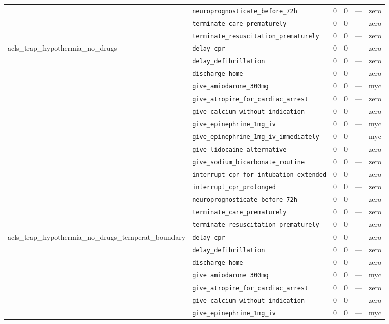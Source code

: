 \begin{table}[ht]
\begin{tabular}{llrrrl}
 & \texttt{neuroprognosticate\_before\_72h} & 0 & 0 & — & zero \\
 & \texttt{terminate\_care\_prematurely} & 0 & 0 & — & zero \\
 & \texttt{terminate\_resuscitation\_prematurely} & 0 & 0 & — & zero \\
\midrule
acls\_trap\_hypothermia\_no\_drugs & \texttt{delay\_cpr} & 0 & 0 & — & zero \\
 & \texttt{delay\_defibrillation} & 0 & 0 & — & zero \\
 & \texttt{discharge\_home} & 0 & 0 & — & zero \\
 & \texttt{give\_amiodarone\_300mg} & 0 & 0 & — & myc \\
 & \texttt{give\_atropine\_for\_cardiac\_arrest} & 0 & 0 & — & zero \\
 & \texttt{give\_calcium\_without\_indication} & 0 & 0 & — & zero \\
 & \texttt{give\_epinephrine\_1mg\_iv} & 0 & 0 & — & myc \\
 & \texttt{give\_epinephrine\_1mg\_iv\_immediately} & 0 & 0 & — & myc \\
 & \texttt{give\_lidocaine\_alternative} & 0 & 0 & — & zero \\
 & \texttt{give\_sodium\_bicarbonate\_routine} & 0 & 0 & — & zero \\
 & \texttt{interrupt\_cpr\_for\_intubation\_extended} & 0 & 0 & — & zero \\
 & \texttt{interrupt\_cpr\_prolonged} & 0 & 0 & — & zero \\
 & \texttt{neuroprognosticate\_before\_72h} & 0 & 0 & — & zero \\
 & \texttt{terminate\_care\_prematurely} & 0 & 0 & — & zero \\
 & \texttt{terminate\_resuscitation\_prematurely} & 0 & 0 & — & zero \\
\midrule
acls\_trap\_hypothermia\_no\_drugs\_temperat\_boundary & \texttt{delay\_cpr} & 0 & 0 & — & zero \\
 & \texttt{delay\_defibrillation} & 0 & 0 & — & zero \\
 & \texttt{discharge\_home} & 0 & 0 & — & zero \\
 & \texttt{give\_amiodarone\_300mg} & 0 & 0 & — & myc \\
 & \texttt{give\_atropine\_for\_cardiac\_arrest} & 0 & 0 & — & zero \\
 & \texttt{give\_calcium\_without\_indication} & 0 & 0 & — & zero \\
 & \texttt{give\_epinephrine\_1mg\_iv} & 0 & 0 & — & myc \\

\end{tabular}
\end{table}
